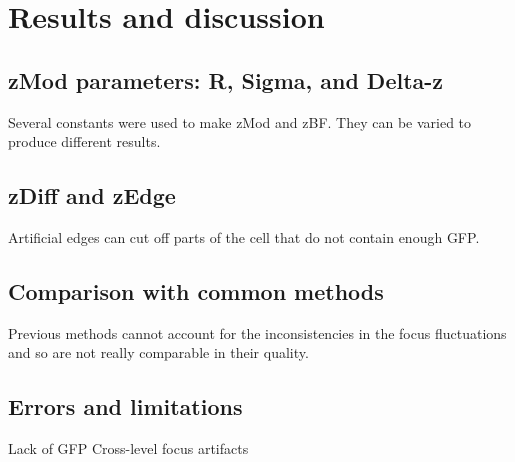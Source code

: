 
\chapter{Results and discussion}

\ifpdf
    \graphicspath{{Chapter5/Figs/Raster/}{Chapter5/Figs/PDF/}{Chapter5/Figs/}}
\else
    \graphicspath{{Chapter5/Figs/Vector/}{Chapter5/Figs/}}
\fi

\section{zMod parameters: R, Sigma, and Delta-z}

Several constants were used to make zMod and zBF. They can be varied to produce different results.

\section{zDiff and zEdge}

Artificial edges can cut off parts of the cell that do not contain enough GFP.

\section{Comparison with common methods}

Previous methods cannot account for the inconsistencies in the focus fluctuations and so are not really comparable in their quality.

\section{Errors and limitations}

Lack of GFP
Cross-level focus artifacts
